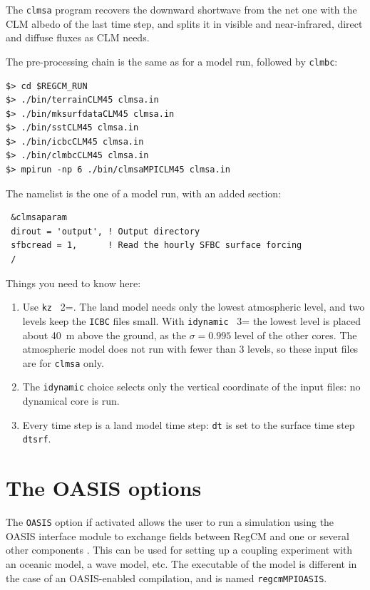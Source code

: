The \verb=clmsa= program recovers the downward shortwave from the net one
with the CLM albedo of the last time step, and splits it in visible and
near-infrared, direct and diffuse fluxes as CLM needs.

The pre-processing chain is the same as for a model run, followed by
\verb=clmbc=:

\begin{Verbatim}
$> cd $REGCM_RUN
$> ./bin/terrainCLM45 clmsa.in
$> ./bin/mksurfdataCLM45 clmsa.in
$> ./bin/sstCLM45 clmsa.in
$> ./bin/icbcCLM45 clmsa.in
$> ./bin/clmbcCLM45 clmsa.in
$> mpirun -np 6 ./bin/clmsaMPICLM45 clmsa.in
\end{Verbatim}

The namelist is the one of a model run, with an added section:

\begin{Verbatim}
 &clmsaparam
 dirout = 'output', ! Output directory
 sfbcread = 1,      ! Read the hourly SFBC surface forcing
 /
\end{Verbatim}

Things you need to know here:

\begin{enumerate}
\item Use \verb=kz = 2=. The land model needs only the lowest atmospheric
level, and two levels keep the \verb=ICBC= files small. With
\verb=idynamic = 3= the lowest level is placed about 40~m above the ground,
as the $\sigma = 0.995$ level of the other cores. The atmospheric model
does not run with fewer than 3 levels, so these input files are for
\verb=clmsa= only.
\item The \verb=idynamic= choice selects only the vertical coordinate of the
input files: no dynamical core is run.
\item Every time step is a land model time step: \verb=dt= is set to the
surface time step \verb=dtsrf=.
\end{enumerate}

\section{The OASIS options}
\label{oasis}

The \verb=OASIS= option if activated allows the user to run a simulation using
the OASIS interface module to exchange fields between RegCM and one or several
other components \citep{craig_2017}. This can be used for setting up a coupling experiment with
an oceanic model, a wave model, etc.
The executable of the model is different in the case of an OASIS-enabled
compilation, and is named \verb=regcmMPIOASIS=.

